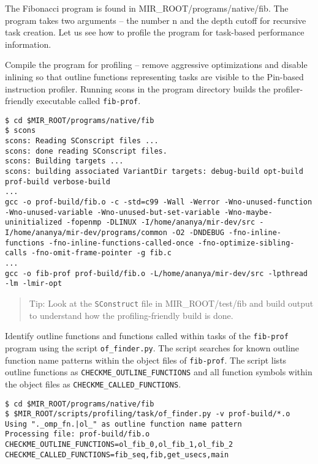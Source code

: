 \documentclass[11pt,a4paper]{article}
\begin{document}
The Fibonacci program is found in MIR\_ROOT/programs/native/fib. The program takes two arguments -- the number n and the depth cutoff for recursive task creation. Let us see how to profile the program for task-based performance information.

Compile the program for profiling -- remove aggressive optimizations and disable inlining so that outline functions representing tasks are visible to the Pin-based instruction profiler. Running scons in the program directory builds the profiler-friendly executable called \texttt{fib-prof}.

\begin{lstlisting}[style=MyInputStyle]
$ cd $MIR_ROOT/programs/native/fib
$ scons
scons: Reading SConscript files ...
scons: done reading SConscript files.
scons: Building targets ...
scons: building associated VariantDir targets: debug-build opt-build prof-build verbose-build
...
gcc -o prof-build/fib.o -c -std=c99 -Wall -Werror -Wno-unused-function -Wno-unused-variable -Wno-unused-but-set-variable -Wno-maybe-uninitialized -fopenmp -DLINUX -I/home/ananya/mir-dev/src -I/home/ananya/mir-dev/programs/common -O2 -DNDEBUG -fno-inline-functions -fno-inline-functions-called-once -fno-optimize-sibling-calls -fno-omit-frame-pointer -g fib.c
...
gcc -o fib-prof prof-build/fib.o -L/home/ananya/mir-dev/src -lpthread -lm -lmir-opt
\end{lstlisting}

\begin{framed}
\begin{quote}
Tip: Look at the \texttt{SConstruct} file in MIR\_ROOT/test/fib and build output to understand how the profiling-friendly build is done.
\end{quote}
\end{framed}

Identify outline functions and functions called within tasks of the \texttt{fib-prof} program using the script \texttt{of\_finder.py}. The script searches for known outline function name patterns within the object files of \texttt{fib-prof}. The script lists outline functions as \texttt{CHECKME\_OUTLINE\_FUNCTIONS} and all function symbols within the object files as \texttt{CHECKME\_CALLED\_FUNCTIONS}.

\begin{lstlisting}[style=MyInputStyle]
$ cd $MIR_ROOT/programs/native/fib
$ $MIR_ROOT/scripts/profiling/task/of_finder.py -v prof-build/*.o
Using "._omp_fn.|ol_" as outline function name pattern
Processing file: prof-build/fib.o
CHECKME_OUTLINE_FUNCTIONS=ol_fib_0,ol_fib_1,ol_fib_2
CHECKME_CALLED_FUNCTIONS=fib_seq,fib,get_usecs,main
\end{lstlisting}
\end{document}
